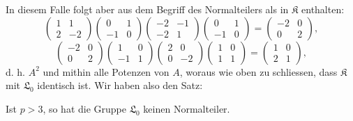 \documentclass[11pt]{article}
\newcommand{\Lzero}{\mathfrak L_0}
\newcommand{\Kgrp}{\mathfrak K}
\begin{document}
In diesem Falle folgt aber aus dem Begriff des Normalteilers als in $\Kgrp$ enthalten:
\[
\begin{pmatrix}1&1\\2&-2\end{pmatrix}
\begin{pmatrix}0&1\\-1&0\end{pmatrix}
\begin{pmatrix}-2&-1\\-2&1\end{pmatrix}
\begin{pmatrix}0&1\\-1&0\end{pmatrix}
=\begin{pmatrix}-2&0\\0&2\end{pmatrix},
\]
\[
\begin{pmatrix}-2&0\\0&2\end{pmatrix}
\begin{pmatrix}1&0\\-1&1\end{pmatrix}
\begin{pmatrix}2&0\\0&-2\end{pmatrix}
\begin{pmatrix}1&0\\1&1\end{pmatrix}
=\begin{pmatrix}1&0\\2&1\end{pmatrix},
\]
d. h. $A^2$ und mithin alle Potenzen von $A$, woraus wie oben zu schliessen, dass $\Kgrp$ mit $\Lzero$ identisch ist. Wir haben also den Satz:

Ist $p>3$, so hat die Gruppe $\Lzero$ keinen Normalteiler.
\end{document}
